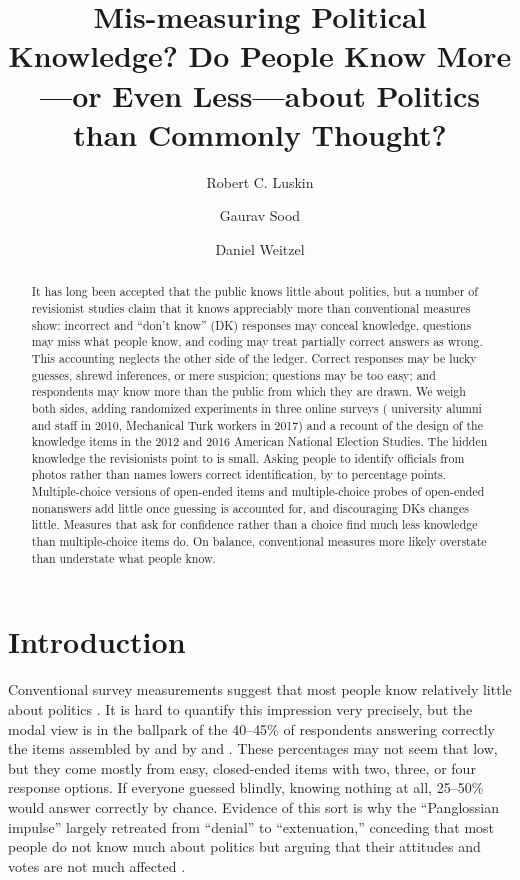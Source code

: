 \documentclass[11pt]{article}
\title{Mis-measuring Political Knowledge? Do People Know More---or Even Less---about Politics than Commonly Thought?}
\author{Robert C. Luskin \and Gaurav Sood \and Daniel Weitzel}
\date{}
\begin{document}
\maketitle

\begin{abstract}
\noindent It has long been accepted that the public knows little about politics, but a number of revisionist studies claim that it knows appreciably more than conventional measures show: incorrect and ``don't know'' (DK) responses may conceal knowledge, questions may miss what people know, and coding may treat partially correct answers as wrong. This accounting neglects the other side of the ledger. Correct responses may be lucky guesses, shrewd inferences, or mere suspicion; questions may be too easy; and respondents may know more than the public from which they are drawn. We weigh both sides, adding randomized experiments in three online surveys (\nAlumni{} university alumni and \nStaff{} staff in 2010, \nMturk{} Mechanical Turk workers in 2017) and a recount of the design of the \nItems{} knowledge items in the 2012 and 2016 American National Election Studies. The hidden knowledge the revisionists point to is small. Asking people to identify officials from photos rather than names lowers correct identification, by \cueAlumni{} to \cueMturk{} percentage points. Multiple-choice versions of open-ended items and multiple-choice probes of open-ended nonanswers add little once guessing is accounted for, and discouraging DKs changes little. Measures that ask for confidence rather than a choice find much less knowledge than multiple-choice items do. On balance, conventional measures more likely overstate than understate what people know.
\end{abstract}

\section{Introduction}

Conventional survey measurements suggest that most people know relatively little about politics \citep{dellicarpini1996, luskin1987, kinder1998, price1999}. It is hard to quantify this impression very precisely, but the modal view is in the ballpark of the 40--45\% of respondents answering correctly the items assembled by \citet{dellicarpini1996} and by \citet{jerit2012} and \citet{barabas2014}. These percentages may not seem that low, but they come mostly from easy, closed-ended items with two, three, or four response options. If everyone guessed blindly, knowing nothing at all, 25--50\% would answer correctly by chance. Evidence of this sort is why the ``Panglossian impulse'' \citep{luskin2002} largely retreated from ``denial'' to ``extenuation,'' conceding that most people do not know much about politics but arguing that their attitudes and votes are not much affected \citep{lupia1994, popkin1991}.
\end{document}
